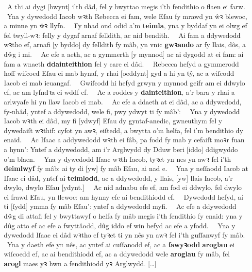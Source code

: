 \begin{Parallel}{0.425\textwidth}{0.545\textwidth}
{	~A thi ai dygi [hwynt] i’th dâd, fel y bwyttao megis i’th fendithio o flaen ei farw.\ %
	~Yna y dywedodd Iacob wꝛth Rebecca ei fam, wele Eſau fy mrawd yn ŵꝛ blewoc, a minne yn ŵꝛ llyfn.\ %
	~Fy nhad ond odid a’m \textbf{teimla}, yna y byddaf yn ei olwg ef fel twyll-wꝛ: felly y dygaf arnaf felldith, ac nid bendith.\ %
	~Ai fam a ddywedodd wꝛtho ef, arnafi [y byddo] dy felldith fy mâb, yn vnic \textbf{gwꝛando} ar fy llais, dôs, a dŵg i mi.\ %
	~Ac efe a aeth, ac a gymmerth [y mynnod] ac ai dygodd at ei fam: ai fam a wnaeth \textbf{ddainteithion} fel y care ei dâd.\ %
	~Rebecca hefyd a gymmerodd hoff wiſcoed Eſau ei mab hynaf, y rhai [oeddynt] gyd a hi yn tŷ, ac a wiſcodd Iacob ei mab ieuangaf.\ %
	~Gwiſcodd hi hefyd grwyn y mynnod geifr am ei ddwylo ef, ac am lyfndꝛa ei wddf ef.\ %
	~Ac a roddes y \textbf{dainteithion}, a’r bara y rhai a arlwyaſe hi yn llaw Iacob ei mab.\ %
	~Ac efe a ddaeth at ei dâd, ac a ddywedodd, fy-nhâd, yntef a ddywedodd, wele fi, pwy ydwyt ti fy mâb’:\ %
	~Yna y dywedodd Iacob wꝛth ei dâd, my fi [ydwyf] Eſau dy gyntaf-anedic, gwneuthym fel y dywedaiſt wꝛthif: cyfot yn awꝛ, eiſtedd, a bwytta o’m helfa, fel i’m bendithio dy enaid.\ %
	~Ac Iſaac a addywedodd wꝛth ei fâb, pa fodd fy mab y cefaiſt moꝛr fuan a hynn’: Yntef a ddywedodd, am i’r Arglwydd dy Dduw beri [iddo] ddigwyddo o’m blaen.\ %
	~Yna y dywedodd Iſaac wꝛth Iacob, tyꝛet yn nes yn awꝛ fel i’th \textbf{deimlwyf} fy mâb: ai ty di [yw] fy mâb Eſau, ai nad e.\ %
	~Yna y neſſaodd Iacob at Iſaac ei dâd, yntef ai \textbf{teimlodd}, ac a ddywedodd, y llais, [yw] llais Iacob, a’r dwylo, dwylo Eſau [ydynt.]\ %
	~Ac nid adnabu efe ef, am fod ei ddwylo, fel dwylo ei frawd Eſau, yn flewoc: am hynny efe ai bendithiodd ef.\ %
	~Dywedodd hefyd, ai ti [ſydd] ymma fy mâb Eſau’: yntef a ddywedodd myfi.\ %
	~Ac efe a ddywedodd dŵg di attafi fel y bwyttawyf o helfa fy mâb megis i’th fendithio fy enaid: yna y dûg atto ef ac efe a fwyttâodd, dûg iddo ef win hefyd ac efe a yfodd.\ %
	~Yna y dywedodd Iſaac ei dâd wꝛtho ef tyꝛet ti yn nês yn awꝛ fel i’th guſſanwyf fy mâb.\ %
	~Yna y daeth efe yn nês, ac yntef ai cuſſanodd ef, ac a \textbf{ſawyꝛodd} \textbf{aroglau} ei wiſcoedd ef, ac ai bendithiodd ef, ac a ddywedodd wele \textbf{aroglau} fy mâb, fel \textbf{arogl} maes yꝛ hwn a fendithiodd yꝛ Arglwydd.
	[…]
}
\end{Parallel}

